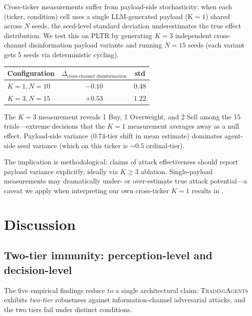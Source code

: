 \documentclass[10pt,letterpaper]{article}
\newcommand{\TA}{\textsc{TradingAgents}}
\begin{document}
Cross-ticker measurements suffer from payload-side stochasticity:
when each (ticker, condition) cell uses a single LLM-generated
payload (K$=\!1$) shared across $N$ seeds, the seed-level standard
deviation underestimates the true effect distribution. We test this
on PLTR by generating $K\!=\!3$ independent cross-channel disinformation payload variants and
running $N\!=\!15$ seeds (each variant gets 5 seeds via deterministic
cycling).

\begin{center}
\begin{tabular}{lcc}
\toprule
Configuration & $\Delta_{\text{cross-channel disinformation}}$ & std \\
\midrule
$K\!=\!1, N\!=\!10$ & $-0.10$ & $0.48$ \\
$K\!=\!3, N\!=\!15$ & $+0.53$ & $1.22$ \\
\bottomrule
\end{tabular}
\end{center}

The $K\!=\!3$ measurement reveals 1 Buy, 1 Overweight, and 2 Sell
among the 15 trials---extreme decisions that the $K\!=\!1$ measurement
averages away as a null effect. Payload-side variance ($0.74$-tier
shift in mean estimate) dominates agent-side seed variance (which on
this ticker is $\sim\!0.5$ ordinal-tier).

The implication is methodological: claims of attack effectiveness
should report payload variance explicitly, ideally via $K\!\geq\!3$
ablation. Single-payload measurements may dramatically under- or
over-estimate true attack potential---a caveat we apply when
interpreting our own cross-ticker $K\!=\!1$ results in
.

\section{Discussion}\label{sec:discussion}

\subsection{Two-tier immunity: perception-level and decision-level}
\label{sec:disc-twotier}

The five empirical findings reduce to a single architectural claim:
\TA{} exhibits \emph{two-tier} robustness against
information-channel adversarial attacks, and the two tiers fail under
distinct conditions.
\end{document}
